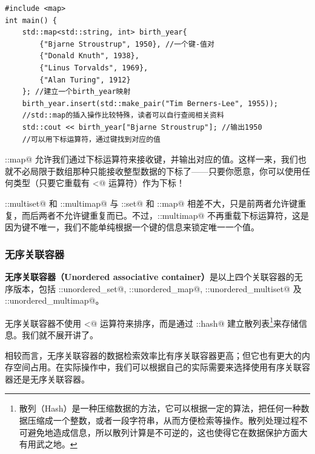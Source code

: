 \begin{lstlisting}
#include <map>
int main() {
    std::map<std::string, int> birth_year{
        {"Bjarne Stroustrup", 1950}, //一个键-值对
        {"Donald Knuth", 1938},
        {"Linus Torvalds", 1969},
        {"Alan Turing", 1912}
    }; //建立一个birth_year映射
    birth_year.insert(std::make_pair("Tim Berners-Lee", 1955));
    //std::map的插入操作比较特殊，读者可以自行查阅相关资料
    std::cout << birth_year["Bjarne Stroustrup"]; //输出1950
    //可以用下标运算符，通过键找到对应的值
\end{lstlisting}
\lstinline@std::map@ 允许我们通过下标运算符来接收键，并输出对应的值。这样一来，我们也就不必局限于数组那种只能接收整型数据的下标了——只要你愿意，你可以使用任何类型（只要它重载有 \lstinline@<@ 运算符）作为下标！\par
\lstinline@std::multiset@ 和 \lstinline@std::multimap@ 与 \lstinline@std::set@ 和 \lstinline@std::map@ 相差不大，只是前两者允许键重复，而后两者不允许键重复而已。不过，\lstinline@std::multimap@ 不再重载下标运算符，这是因为键不唯一，我们不能单纯根据一个键的信息来锁定唯一一个值。\par
\subsubsection*{无序关联容器}
\textbf{无序关联容器（Unordered associative container）}是以上四个关联容器的无序版本，包括 \lstinline@std::unordered_set@, \lstinline@std::unordered_map@, \lstinline@std::unordered_multiset@ 及 \lstinline@std::unordered_multimap@。\par
无序关联容器不使用 \lstinline@<@ 运算符来排序，而是通过 \lstinline@std::hash@ 建立散列表\footnote{散列（Hash）是一种压缩数据的方法，它可以根据一定的算法，把任何一种数据压缩成一个整数，或者一段字符串，从而方便检索等操作。散列处理过程不可避免地造成信息，所以散列计算是不可逆的，这也使得它在数据保护方面大有用武之地。}来存储信息。我们就不展开讲了。\par
相较而言，无序关联容器的数据检索效率比有序关联容器更高；但它也有更大的内存空间占用。在实际操作中，我们可以根据自己的实际需要来选择使用有序关联容器还是无序关联容器。\par
